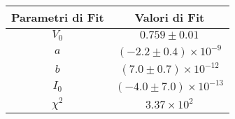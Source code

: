 \begin{tabular}{cc}
\hline
	Parametri di Fit & Valori di Fit\\ 
\hline
	$V_0$ & $0.759\pm0.01$ \\
	$a$ & $(-2.2\pm0.4)\times 10^{-9}$ \\
	$b$ & $(7.0\pm0.7)\times 10^{-12}$ \\
	$I_0$ & $(-4.0\pm7.0)\times 10^{-13}$ \\
	$\chi^2$ & $3.37\times 10^{2}$ \\
\hline
\end{tabular}
